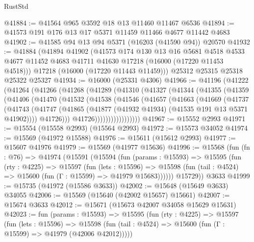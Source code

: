 \begin{lexlean}{RustStd}
\begin{coremodule}
@41884 := @41564 @965 @3592 @18 @13 @11460 @11467 @6536
@41894 := @41573 @191 @176 @13 @17 @5371 @11459 @11466 @4677 @11442 @4683
@41902 := @41585 @94 @13 @94 @5371 (@16203 (@41590 @94)) @20570
@41932 := @41884
    (@41894
      @41902
      (@41573
        @174
        @130
        @13
        @16
        @5681
        @4518
        @4533
        @4677
        @11452
        @4683
        @41711
        @41630
        @17218
        (@16000 (@17220 @11453 @4518)))
      @17218
      (@16000 (@17220 @11443 @11459)))
    @25312
    @25315
    @25318
    @25322
    @25327
@41934 := @16000 (@25331 @4306)
@41966 := @41196
    (@41222
      (@41264
        (@41266
          (@41268
            (@41289
              (@41310
                (@41327
                  (@41344
                    (@41355
                      (@41359
                        (@41406
                          (@41470
                            (@41532
                              (@41538
                                (@41546
                                  (@41657
                                    (@41663
                                      (@41669
                                        (@41737
                                          (@41743
                                            (@41747
                                              (@41865
                                                (@41877
                                                  (@41932 @41934)
                                                  (@41535 @191 @13 @5371 @41902))))
                                            @41726)))
                                      @41726)))))))))))))))))
@41967 := @15552 @2993
@41971 := @15554 (@15558 @2993) (@15564 @2993)
@41972 := @15573 @34052
@41974 := @15569 (@41972 @15588)
@41976 := @15611 (@15612 @2993)
@41977 := @15607 @41976
@41979 := @15569 (@41977 @15636)
@41996 := @15568
    (fun (fn : @76) =>
    @41974
      (@15591
        (@15594
          (fun (params : @15593) =>
          @15595
            (fun (rty : @4225) =>
            @15597
              (fun (lets : @15596) =>
              @15598 (fun (tail : @4524) => @15600 (fun (Γ : @15599) => @41979 @15683))))))
        @15729))
    @3633
@41999 := @15735 (@41972 (@15586 @3633))
@42002 := @15648 (@15649 @3633) @34055
@42006 := @15569 (@15640 (@42002 @15657) @15661)
@42007 := @15674 @3633
@42012 := @15671 (@15673 @42007 @34058 @15629 @15631)
@42023 := fun (params : @15593) =>
  @15595
    (fun (rty : @4225) =>
    @15597
      (fun (lets : @15596) =>
      @15598 (fun (tail : @4524) => @15600 (fun (Γ : @15599) => @41979 (@42006 @42012)))))

\end{coremodule}
\end{lexlean}
